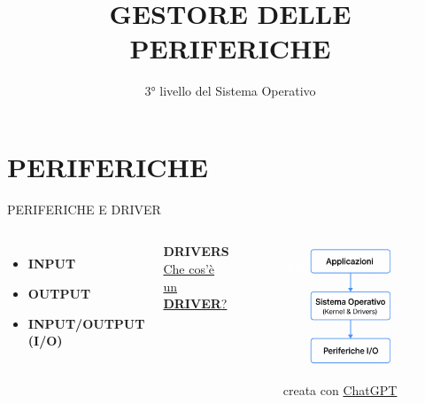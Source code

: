 \documentclass[aspectratio=1610]{beamer}
\title{GESTORE DELLE PERIFERICHE}
\subtitle{3° livello del Sistema Operativo}
\date{}
\institute{\textit{
        Fonti:
        \begin{itemize}
            \item[-] \href{https://www.unimi.it/it/corsi/laurea-triennale/informatica}{Appunti Università degli Studi di Milano}
        \end{itemize}
    }
}
\begin{document}
\begin{frame}
    \titlepage
\end{frame}

\section{PERIFERICHE}

\begin{frame}{PERIFERICHE E DRIVER}
    \begin{columns}
        \begin{itemize}
            \item \textbf{INPUT}
            \item \textbf{OUTPUT}
            \item \textbf{INPUT/OUTPUT (I/O)}
        \end{itemize}
        \bigskip
        \tiny{\textbf{DRIVERS}}\\
        \tiny{\href{https://learn.microsoft.com/it-it/windows-hardware/drivers/gettingstarted/what-is-a-driver-}{Che cos'è un \textbf{DRIVER}?}}
        \begin{figure}
            \includegraphics[width=\linewidth]{img/drivers.png}
            \caption{{creata con \href{https://chatgpt.com/}{ChatGPT}}}
        \end{figure}
    \end{columns}
\end{frame}
\end{document}
